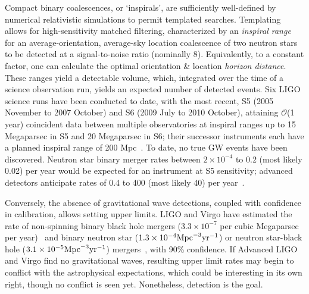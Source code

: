 Compact binary coalescences, or `inspirals', are sufficiently well-defined by numerical relativistic simulations to permit templated searches.
Templating allows for high-sensitivity matched filtering, characterized by an \textit{inspiral range}~\cite{FinnInspiral1993} for an average-orientation, average-sky location coalescence of two neutron stars to be detected at a signal-to-noise ratio (nominally 8).
Equivalently, to a constant factor, one can calculate the optimal orientation \& location \textit{horizon distance}.
These ranges yield a detectable volume, which, integrated over the time of a science observation run, yields an expected number of detected events.
Six LIGO science runs have been conducted to date, with the most recent, S5 (2005 November to 2007 October) and S6 (2009 July to 2010 October), attaining $\mathcal{O}$(1 year) coincident data between multiple observatories at inspiral ranges up to 15 Megaparsec in S5 and 20 Megaparsec in S6; their successor instruments each have a planned inspiral range of 200 Mpc~\cite{HarryALIGO2010}.
To date, no true GW events have been discovered.
Neutron star binary merger rates between $2\times 10^{-4}$ to 0.2 (most likely 0.02) per year would be expected for an instrument at S5 sensitivity; advanced detectors anticipate rates of 0.4 to 400 (most likely 40) per year~\cite{AbadieRates2010}.

Conversely, the absence of gravitational wave detections, coupled with confidence in calibration, allows setting upper limits.
LIGO and Virgo have estimated the rate of non-spinning binary black hole mergers ($3.3\times10^{-7}$ per cubic Megaparsec per year)~\cite{AasiBBH2013} and binary neutron star ($1.3\times10^{-4} \textup{Mpc}^{-3} \textup{yr}^{-1}$) or neutron star-black hole ($3.1\times10^{-5} \textup{Mpc}^{-3} \textup{yr}^{-1}$) mergers~\cite{AbadieCBC2012}, with 90\% confidence.
If Advanced LIGO and Virgo find no gravitational waves, resulting upper limit rates may begin to conflict with the astrophysical expectations, which could be interesting in its own right, though no conflict is seen yet.
Nonetheless, detection is the goal.

